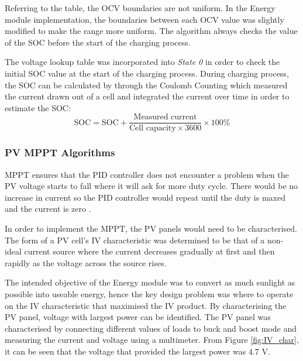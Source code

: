 \documentclass[11pt, a4paper]{article}
\begin{document}
Referring to the table, the OCV boundaries are not uniform. In the Energy module implementation, the boundaries between each OCV value was slightly modified to make the range more uniform. The algorithm always checks the value of the SOC before the start of the charging process.

The voltage lookup table was incorporated into \textit{State 0} in order to check the initial SOC value at the start of the charging process. During charging process, the SOC can be calculated by through the Coulomb Counting which measured the current drawn out of a cell and integrated the current over time in order to estimate the SOC:
$$
    \text{SOC} = \text{SOC} + \frac{\text{Measured current}}{\text{Cell capacity} \times 3600} \times 100\%
$$

\pagebreak

\subsubsection{PV MPPT Algorithms}

MPPT ensures that the PID controller does not encounter a problem when the PV voltage starts to fall where it will ask for more duty cycle. There would be no increase in current so the PID controller would repeat until the duty is maxed and the current is zero \cite{PV_MPPT}.  

In order to implement the MPPT, the PV panels would need to be characterised. The form of a PV cell's IV characteristic was determined to be that of a non-ideal current source \cite{PV_current} where the current decreases gradually at first and then rapidly as the voltage across the source rises.

The intended objective of the Energy module was to convert as much sunlight as possible into useable energy, hence the key design problem was where to operate on the IV characteristic that maximised the IV product. By characterising the PV panel, voltage with largest power can be identified. The PV panel was characterised by connecting different values of loads to buck and boost mode and measuring the current and voltage using a multimeter. From Figure \ref{fig:IV_char}, it can be seen that the voltage that provided the largest power was $4.7$ V.
\end{document}
